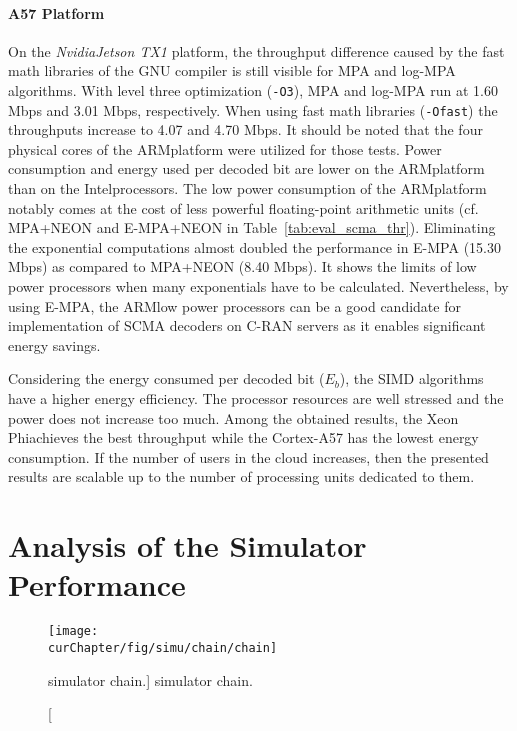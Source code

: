 \paragraph{A57 Platform}

On the \emph{Nvidia\R Jetson TX1} platform, the throughput difference caused by
the fast math libraries of the GNU compiler is still visible for MPA and log-MPA
algorithms. With level three optimization (\verb|-O3|), MPA and log-MPA run at
1.60 Mbps and 3.01 Mbps, respectively. When using fast math libraries
(\verb|-Ofast|) the throughputs increase to 4.07 and 4.70 Mbps. It should be
noted that the four physical cores of the ARM\R platform were  utilized for
those tests. Power consumption and energy used per decoded bit are lower on the
ARM\R platform than on the Intel\R processors. The low power consumption of the
ARM\R platform notably comes at the cost of less powerful floating-point
arithmetic units (cf. MPA+NEON and E-MPA+NEON in Table~\ref{tab:eval_scma_thr}).
Eliminating the exponential computations almost doubled the performance in E-MPA
(15.30 Mbps) as compared to MPA+NEON (8.40 Mbps). It shows the limits of low
power processors when many exponentials have to be calculated. Nevertheless, by
using E-MPA, the ARM\R low power processors can be a good candidate for
implementation of SCMA decoders on C-RAN servers as it enables significant
energy savings.

Considering the energy consumed per decoded bit ($E_b$), the SIMD algorithms
have a higher energy efficiency. The processor resources are well stressed and
the power does not increase too much. Among the obtained results, the Xeon
Phi\TM achieves the best throughput while the Cortex-A57 has the lowest energy
consumption. If the number of users in the cloud increases, then the presented
results are scalable up to the number of processing units dedicated to them.

\section{Analysis of the Simulator Performance}
\label{sec:eval_simu}

\begin{figure}[htp]
  \centering
  \texttt{[image: \\curChapter/fig/simu/chain/chain]}
  \caption
    [\AFFECT simulator chain.]
    {\AFFECT simulator chain.}
  \label{fig:simu_chain}
\end{figure}


